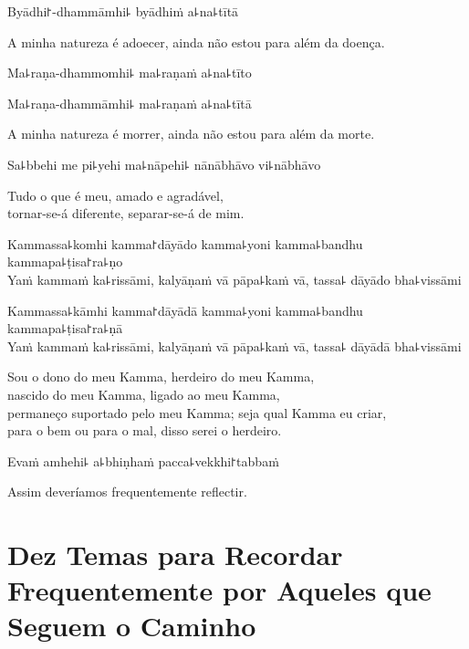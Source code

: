 %
Byādhi꜓-dhammāmhi꜕ byādhiṁ a꜕na꜕tītā

\begin{english}
  A minha natureza é adoecer, ainda não estou para além da doença.
\end{english}

%
Ma꜕raṇa-dhammomhi꜕ ma꜕raṇaṁ a꜕na꜕tīto

%
Ma꜕raṇa-dhammāmhi꜕ ma꜕raṇaṁ a꜕na꜕tītā

\begin{english}
  A minha natureza é morrer, ainda não estou para além da morte.
\end{english}

Sa꜕bbehi me pi꜕yehi ma꜕nāpehi꜕ nānābhāvo vi꜕nābhāvo

\begin{english}
  Tudo o que é meu, amado e agradável,\\
  tornar-se-á diferente, separar-se-á de mim.
\end{english}

%
Kammassa꜕komhi kamma꜓dāyādo kamma꜕yoni kamma꜕bandhu kammapa꜕ṭisa꜓ra꜕ṇo\\
Yaṁ kammaṁ ka꜕rissāmi, kalyāṇaṁ vā pāpa꜕kaṁ vā, tassa꜕ dāyādo bha꜕vissāmi

\clearpage

%
Kammassa꜕kāmhi kamma꜓dāyādā kamma꜕yoni kamma꜕bandhu kammapa꜕ṭisa꜓ra꜕ṇā\\
Yaṁ kammaṁ ka꜕rissāmi, kalyāṇaṁ vā pāpa꜕kaṁ vā, tassa꜕ dāyādā bha꜕vissāmi

\begin{english}
  Sou o dono do meu Kamma, herdeiro do meu Kamma,\\
  nascido do meu Kamma, ligado ao meu Kamma,\\
  permaneço suportado pelo meu Kamma; seja qual Kamma eu criar,\\
  para o bem ou para o mal, disso serei o herdeiro.
\end{english}

Evaṁ amhehi꜕ a꜕bhiṇhaṁ pacca꜕vekkhi꜓tabbaṁ

\begin{english}
  Assim deveríamos frequentemente reflectir.
\end{english}

\chapter[Dez Temas]{Dez Temas para Recordar Frequentemente por Aqueles que Seguem o Caminho}

